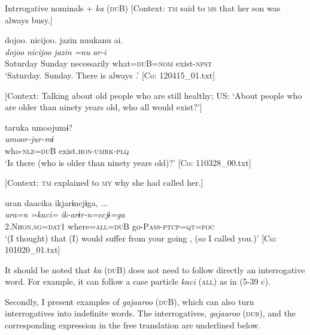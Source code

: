\ea \label{ex:5:39}   Intrrogative nominals + \textit{ka} (\textsc{du}B)
 \ea \label{ex:5:39a} [Context: \textsc{tm} said to \textsc{ms} that her son was always busy.]

\glll  {\textbar}dojoo{\textbar}.  {\textbar}nicijoo{\textbar}.  jazin  nuukanu  ai.\\
\textit{dojoo}  \textit{nicijoo}  \textit{jazin}  \textit{=nu}  \textit{ar-i}\\
Saturday  Sunday  necessarily  what=\textsc{du}B=\textsc{nom}  exist-\textsc{npst}\\
\glt ‘Saturday. Sunday. There is always .’ [Co: 120415\_01.txt]

 \ex \label{ex:5:39b} [Context: Talking about old people who are still healthy; US: ‘About people who are older than ninety years old, who all would exist?’]

\glll  taruka  umoojumɨ?\\
\textit{}  \textit{umoor-jur-mɨ}\\
who-\textsc{nlz}=\textsc{du}B  exist.\textsc{hon}-\textsc{umrk}-\textsc{plq}\\
\glt ‘Is there  (who is older than ninety years old)?’ [Co: 110328\_00.txt]

 \ex \label{ex:5:39c} [Context: \textsc{tm} explained to \textsc{my} why she had called her.]

\glll  uran  daacika  ikjarɨncjɨga, ...\\
\textit{ura=n}  \textit{=kaci=}  \textit{ik-arɨr-n=ccjɨ=ga}\\
2.N\textsc{hon}.\textsc{sg}=\textsc{dat}1  where=\textsc{all}=\textsc{du}B  go-P\textsc{ass}-\textsc{ptcp}=\textsc{qt}=\textsc{foc}\\
\glt ‘(I thought) that (I) would suffer from your going , (so I called you.)’ [Co: 101020\_01.txt]
\z
\z

It should be noted that \textit{ka} (\textsc{du}B) does not need to follow directly an interrogative word. For example, it can follow a case particle \textit{kaci} (\textsc{all}) as in (5-39 c).

  Secondly, I present examples of \textit{gajaaroo} (\textsc{du}B), which can also turn interrogatives into indefinite words. The interrogatives, \textit{gajaaroo} (\textsc{dub}), and the corresponding expression in the free translation are underlined below.


